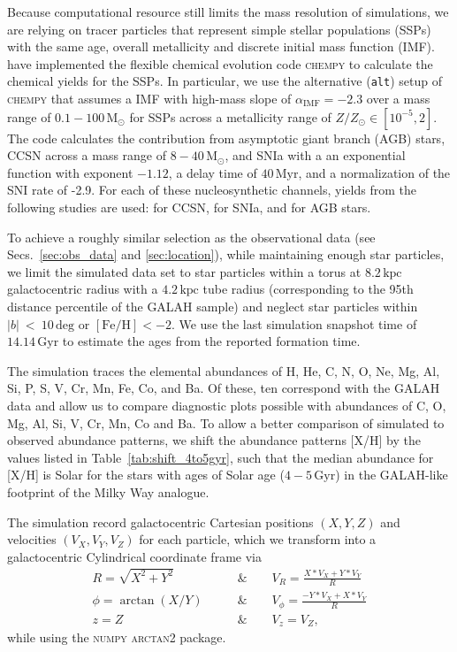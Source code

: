 \documentclass[fleqn,usenatbib]{mnras}
\begin{document}
Because computational resource still limits the mass resolution of simulations, we are relying on tracer particles that represent simple stellar populations (SSPs) with the same age, overall metallicity and discrete initial mass function (IMF). \citet{Buck2021} have implemented the flexible chemical evolution code \textsc{chempy} \citep{Rybizki2017} to calculate the chemical yields for the SSPs. In particular, we use the alternative (\texttt{alt}) setup of \textsc{chempy} that assumes a \citet{Chabrier2003} IMF with high-mass slope of $\alpha_\text{IMF} = -2.3$ over a mass range of $0.1-100\,\mathrm{M_\odot}$ for SSPs across a metallicity range of $Z/Z_\odot \in [10^{-5},2]$. The code calculates the contribution from asymptotic giant branch (AGB) stars, CCSN across a mass range of $8-40\,\mathrm{M_\odot}$, and SNIa with a an exponential function with exponent $-1.12$, a delay time of $40\,\mathrm{Myr}$, and a normalization of the SNI rate of -2.9. For each of these nucleosynthetic channels, yields from the following studies are used: \citet{Limongi2018} for CCSN, \citet{Seitenzahl2013} for SNIa, and \citet{Karakas2016} for AGB stars.

To achieve a roughly similar selection as the observational data (see Secs.~\ref{sec:obs_data} and \ref{sec:location}), while maintaining enough star particles, we limit the simulated data set to star particles within a torus at $8.2\,\mathrm{kpc}$ galactocentric radius with a $4.2\,\mathrm{kpc}$ tube radius (corresponding to the 95th distance percentile of the GALAH sample) and neglect star particles within $\vert b \vert~<~10\,\mathrm{deg}$ or $\mathrm{[Fe/H]} < -2$. We 
use the last simulation snapshot time of $14.14\,\mathrm{Gyr}$ to estimate the ages from the reported formation time.

The simulation traces the elemental abundances of H, He, C, N, O, Ne, Mg, Al, Si, P, S, V, Cr, Mn, Fe, Co, and Ba. Of these, ten correspond with the GALAH data and allow us to compare diagnostic plots possible with abundances of C, O, Mg, Al, Si, V, Cr, Mn, Co and Ba. To allow a better comparison of simulated to observed abundance patterns, we shift the abundance patterns [X/H] by the values listed in Table~\ref{tab:shift_4to5gyr}, such that the median abundance for [X/H] is Solar for the stars with ages of Solar age ($4-5\,\mathrm{Gyr}$) in the GALAH-like footprint of the Milky Way analogue.

The simulation record galactocentric Cartesian positions $(X,Y,Z)$ and velocities $(V_X,V_Y,V_Z)$ for each particle, which we transform into a galactocentric Cylindrical coordinate frame via
\begin{align}
    R = \sqrt{X^2 + Y^2} \qquad &\& \qquad V_R = \frac{X*V_X + Y*V_Y}{R} \\
    \phi = \arctan(X/Y) \qquad &\& \qquad V_\phi = \frac{-Y*V_X + X*V_Y}{R} \\
    z = Z  \qquad &\& \qquad V_z = V_Z,
\end{align}
while using the \textsc{numpy} \textsc{arctan2} package.
\end{document}
